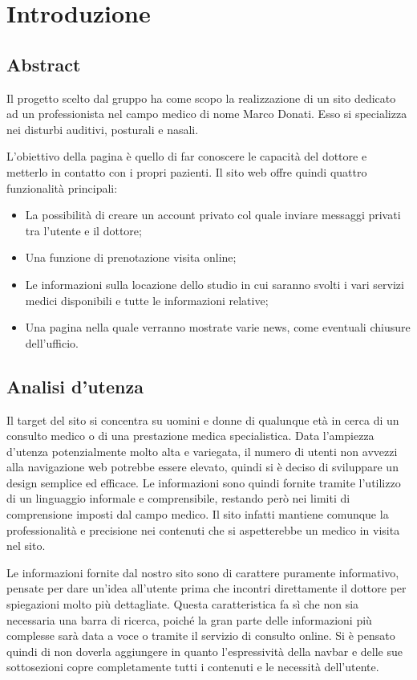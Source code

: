 \section{Introduzione}
\label{introduzione}

\subsection{Abstract}
Il progetto scelto dal gruppo ha come scopo la realizzazione di un sito dedicato ad un professionista nel campo medico di nome Marco Donati. Esso si specializza nei disturbi auditivi, posturali e nasali.

L’obiettivo della pagina è quello di far conoscere le capacità del dottore e metterlo in contatto con i propri pazienti.
Il sito web offre quindi quattro funzionalità principali:
\begin{itemize}
\item La possibilità di creare un account privato col quale inviare messaggi privati tra l’utente e il dottore;
\item Una funzione di prenotazione visita online;
\item Le informazioni sulla locazione dello studio in cui saranno svolti i vari servizi medici disponibili e tutte le informazioni relative;
\item Una pagina nella quale verranno mostrate varie news, come eventuali chiusure dell’ufficio.
\end{itemize}

\subsection{Analisi d'utenza}
Il target del sito si concentra su uomini e donne di qualunque età in cerca di un consulto medico o di una prestazione medica specialistica.
Data l’ampiezza d’utenza potenzialmente molto alta e variegata, il numero di utenti non avvezzi alla navigazione web potrebbe essere elevato, quindi si è deciso di sviluppare un design semplice ed efficace.
Le informazioni sono quindi fornite tramite l’utilizzo di un linguaggio informale e comprensibile, restando però nei limiti di comprensione imposti dal campo medico.
Il sito infatti mantiene comunque la professionalità e precisione nei contenuti che si aspetterebbe un medico in visita nel sito.

Le informazioni fornite dal nostro sito sono di carattere puramente informativo, pensate per dare un’idea all’utente prima che incontri direttamente il dottore per spiegazioni molto più dettagliate.
Questa caratteristica fa sì che non sia necessaria una barra di ricerca, poiché la gran parte delle informazioni più complesse sarà data a voce o tramite il servizio di consulto online.
Si è pensato quindi di non doverla aggiungere in quanto l’espressività della navbar e delle sue sottosezioni copre completamente tutti i contenuti e le necessità dell’utente.

